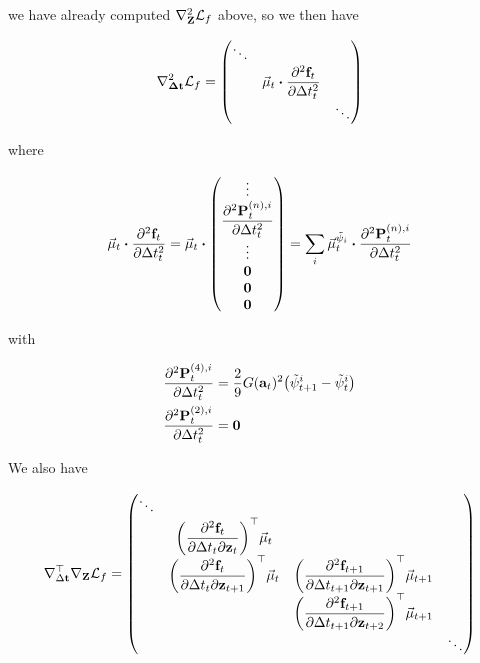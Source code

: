 \documentclass{article}
\newcommand{\isopsi}{\tilde \psi}
\begin{document}
we have already computed $\nabla_{\vb{Z}}^2 \mathcal{L}_f$ above, so we then have

\begin{equation}
  \nabla_{\vb{\Delta \vb{t}}}^2 \mathcal{L}_f = 
  \mqty(
    \ddots \\
    & \displaystyle \vec \mu_t \vdot \pdv[2]{\vb{f}_t}{\Delta t_t} \\
    & & \ddots \\
  )
\end{equation}

where

\begin{equation}
  \vec \mu_t \vdot \pdv[2]{\vb{f}_t}{\Delta t_t} = 
  \vec \mu_t \vdot \mqty(
    \vdots \\
    \displaystyle \pdv[2]{\vb{P}^{(n),i}_t}{\Delta t_t} \\
    \vdots \\
    \vb{0} \\
    \vb{0} \\
    \vb{0} \\
  ) = 
  \sum_i \vec \mu_t^{\isopsi_i} \vdot \pdv[2]{\vb{P}^{(n),i}_t}{\Delta t_t}
\end{equation}

with 

\begin{align}
  \pdv[2]{\vb{P}^{(4),i}_t}{\Delta t_t} 
  &= \frac{2}{9} G(\vb{a}_t)^2 \qty(\isopsi^i_{t+1} - \isopsi^i_t) \\
  \pdv[2]{\vb{P}^{(2),i}_t}{\Delta t_t} 
  &= \vb{0} 
\end{align}


We also have

\begin{equation}
  \nabla^\top_{\Delta \vb{t}} \nabla_{\vb{Z}} \mathcal{L}_f 
  = \mqty(
    \ddots \\
    & \qty( \displaystyle \pdv{\vb{f}_t}{\Delta t_t}{\vb{z}_t} )^\top \vec \mu_t \\ 
    & \qty( \displaystyle \pdv{\vb{f}_t}{\Delta t_t}{\vb{z}_{t+1}} )^\top \vec \mu_t  
    & \qty( \displaystyle \pdv{\vb{f}_{t+1}}{\Delta t_{t+1}}{\vb{z}_{t+1}} )^\top \vec \mu_{t+1} \\ 
    & & \qty( \displaystyle \pdv{\vb{f}_{t+1}}{\Delta t_{t+1}}{\vb{z}_{t+2}} )^\top \vec \mu_{t+1} \\ 
    & & & \ddots \\
  ) \\ 
\end{equation}
\end{document}
